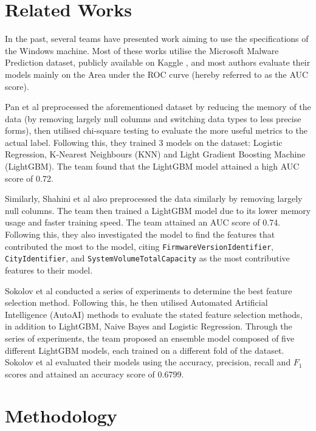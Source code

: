 \documentclass[runningheads]{llncs}
\begin{document}
\section{Related Works}

In the past, several teams have presented work aiming to use the specifications of the Windows machine. Most of these works \cite{iop2020,shahini2019,sokolov2021} utilise the Microsoft Malware Prediction dataset, publicly available on Kaggle \cite{microsoft-malware-prediction}, and most authors evaluate their models mainly on the Area under the ROC curve (hereby referred to as the AUC score).

Pan et al \cite{iop2020} preprocessed the aforementioned dataset by reducing the memory of the data (by removing largely null columns and switching data types to less precise forms), then utilised chi-square testing to evaluate the more useful metrics to the actual label. Following this, they trained 3 models on the dataset: Logistic Regression, K-Nearest Neighbours (KNN) and Light Gradient Boosting Machine (LightGBM). The team found that the LightGBM model attained a high AUC score of 0.72.

Similarly, Shahini et al \cite{shahini2019} also preprocessed the data similarly by removing largely null columns. The team then trained a LightGBM model due to its lower memory usage and faster training speed. The team attained an AUC score of 0.74. Following this, they also investigated the model to find the features that contributed the most to the model, citing \texttt{FirmwareVersionIdentifier}, \texttt{CityIdentifier},  and \texttt{SystemVolumeTotalCapacity} as the most contributive features to their model.

Sokolov et al \cite{sokolov2021} conducted a series of experiments to determine the best feature selection method. Following this, he then utilised Automated Artificial Intelligence (AutoAI) methods to evaluate the stated feature selection methods, in addition to LightGBM, Naive Bayes and Logistic Regression. Through the series of experiments, the team proposed an ensemble model composed of five different LightGBM models, each trained on a different fold of the dataset. Sokolov et al evaluated their models using the accuracy, precision, recall and $F_1$ scores and attained an accuracy score of 0.6799.

\section{Methodology}
\end{document}
